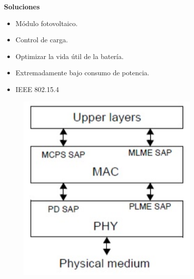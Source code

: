 \documentclass[aspectratio=43, handout]{beamer}
\begin{document}
\begin{frame}{\textbf{\LARGE{Soluciones}}}
\fontsize{15pt}{15}\selectfont
\begin{minipage}[c]{1.0\linewidth}
	\begin{minipage}[c]{0.55\linewidth}
		\begin{itemize}
			\item Módulo fotovoltaico.
					\vspace{10px}
			\item Control de carga.
					\vspace{10px}
			\item Optimizar la vida útil de la batería.
					\vspace{10px}
			\item Extremadamente bajo consumo de potencia.
		\end{itemize}
		\end{minipage}
	\begin{minipage}[c]{0.4\linewidth}
		\begin{itemize}
			\item IEEE 802.15.4
		\end{itemize}		
		\begin{figure}[H]
			{\includegraphics[width=0.8\textwidth]{./imagenes/arquitectura}}
		\end{figure}	
	\end{minipage}
\end{minipage}
\end{frame}

\end{document}
